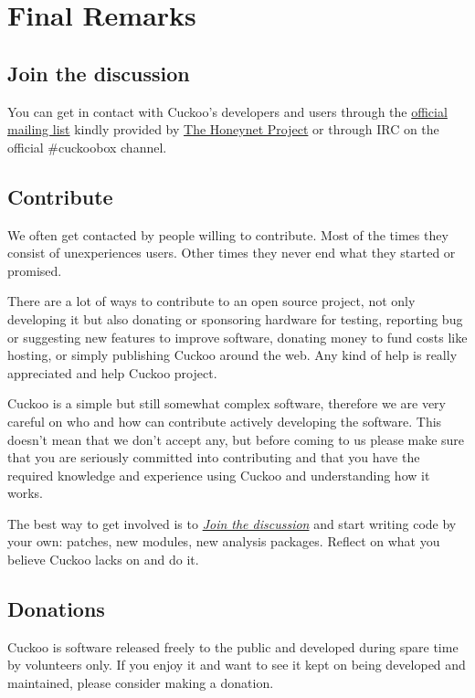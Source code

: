 \documentclass[letterpaper,10pt,english]{sphinxmanual}
\begin{document}
\section{Final Remarks}
\label{finalremarks/index:final-remarks}\label{finalremarks/index::doc}

\subsection{Join the discussion}
\label{finalremarks/index:join-the-discussion}\label{finalremarks/index:id1}
You can get in contact with Cuckoo's developers and users through the \href{https://public.honeynet.org/mailman/listinfo/cuckoo}{official
mailing list} kindly provided by \href{http://www.honeynet.org}{The Honeynet Project} or through IRC on the
official \#cuckoobox channel.


\subsection{Contribute}
\label{finalremarks/index:cuckoobox}\label{finalremarks/index:contribute}
We often get contacted by people willing to contribute. Most of the times they
consist of unexperiences users. Other times they never end what they started or
promised.

There are a lot of ways to contribute to an open source project, not only developing
it but also donating or sponsoring hardware for testing, reporting bug or
suggesting new features to improve software, donating money to fund costs like
hosting, or simply publishing Cuckoo around the web. Any kind of help is really
appreciated and help Cuckoo project.

Cuckoo is a simple but still somewhat complex software, therefore we are very
careful on who and how can contribute actively developing the software. This
doesn't mean that we don't accept any, but before coming to us please make sure
that you are seriously committed into contributing and that you have the
required knowledge and experience using Cuckoo and understanding how it works.

The best way to get involved is to {\hyperref[finalremarks/index:join-the-discussion]{\emph{Join the discussion}}} and start writing
code by your own: patches, new modules, new analysis packages. Reflect on what
you believe Cuckoo lacks on and do it.


\subsection{Donations}
\label{finalremarks/index:donations}
Cuckoo is software released freely to the public and developed during spare time
by volunteers only. If you enjoy it and want to see it kept on being developed
and maintained, please consider making a donation.
\end{document}
